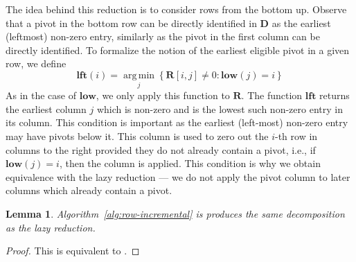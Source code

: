 \documentclass[10pt,a4paper]{article}
\newtheorem{lemma}[theorem]{Lemma}
\newcommand{\mat}[1]{\mathbf{#1}}
\newcommand{\low}{\mathbf{low}}
\newcommand{\lft}{\mathbf{lft}}
\newcommand{\Remark}[1]{\textcolor{blue}{[#1]}}
\DeclareMathOperator*{\argmin}{arg\,min}
\begin{document}
The idea behind this reduction is to consider rows from the bottom up. Observe that a pivot in the bottom row can be directly identified in $\mat{D}$ as the earliest (leftmost) non-zero entry, similarly as the pivot in the first column can be directly identified. To formalize the notion of the earliest eligible pivot in a given row, we define
\[
    \lft(i) = \argmin\limits_j \left\{ \mat{R}[i,j]\neq 0 :  \low(j) = i \right\} %
\]
As in the case of $\low$, we only apply this function to $\mat{R}$. The function $\lft $ returns the earliest column $j$ which is non-zero and is the lowest such non-zero entry in its column.  This condition is important as the earliest (left-most) non-zero entry may have pivots below it. This column is used to zero out the $i$-th row in columns to the right provided they do not already contain a pivot, i.e., if $\low(j)=i$, then the column is applied.  This condition is why we obtain equivalence with the lazy reduction ---  we do not apply the pivot column to later columns which already contain a pivot. 
\begin{lemma}
    Algorithm~\ref{alg:row-incremental} is produces the same decomposition as the lazy reduction.%
\end{lemma}
\begin{proof}
This is equivalent to \cite[Theorem 3.1]{de2011dualities}.
\end{proof}
\end{document}
